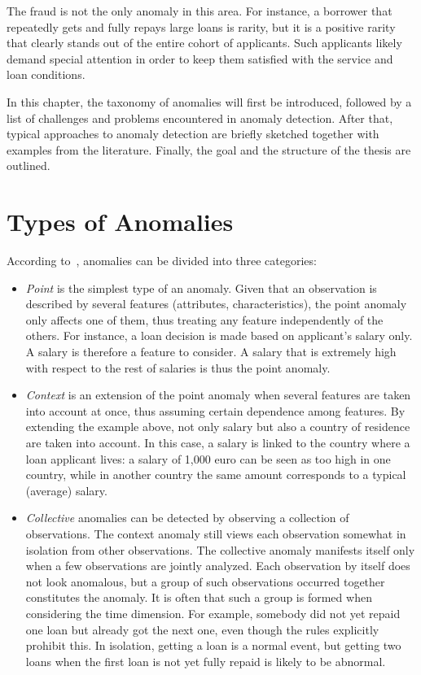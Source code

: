 The fraud is not the only anomaly in this area. For instance, a borrower that repeatedly gets and fully repays large loans is rarity, but it is a positive rarity that clearly stands out of the entire cohort of applicants. Such applicants likely demand special attention in order to keep them satisfied with the service and loan conditions.

In this chapter, the taxonomy of anomalies will first be introduced, followed by a list of challenges and problems encountered in anomaly detection. After that, typical approaches to anomaly detection are briefly sketched together with examples from the literature. Finally, the goal and the structure of the thesis are outlined.

\section{Types of Anomalies}\label{taxonomyofanomalies}
According to~\cite{Chandola:2009:ADS:1541880.1541882}, anomalies can be divided into three categories:
\begin{itemize}
    \item \textit{Point} is the simplest type of an anomaly. Given that an observation is described by several features (attributes, characteristics), the point anomaly only affects one of them, thus treating any feature independently of the others. For instance, a loan decision is made based on applicant's salary only. A salary is therefore a feature to consider. A salary that is extremely high with respect to the rest of salaries is thus the point anomaly.

    \item \textit{Context} is an extension of the point anomaly when several features are taken into account at once, thus assuming certain dependence among features. By extending the example above, not only salary but also a country of residence are taken into account. In this case, a salary is linked to the country where a loan applicant lives: a salary of 1,000 euro can be seen as too high in one country, while in another country the same amount corresponds to a typical (average) salary.

    \item \textit{Collective} anomalies can be detected by observing a collection of observations. The context anomaly still views each observation somewhat in isolation from other observations. The collective anomaly manifests itself only when a few observations are jointly analyzed. Each observation by itself does not look anomalous, but a group of such observations occurred together constitutes the anomaly. It is often that such a group is formed when considering the time dimension. For example, somebody did not yet repaid one loan but already got the next one, even though the rules explicitly prohibit this. In isolation, getting a loan is a normal event, but getting two loans when the first loan is not yet fully repaid is likely to be abnormal.
\end{itemize}

